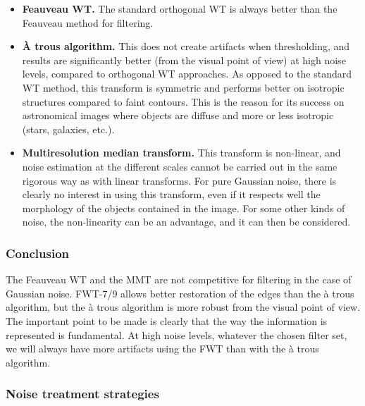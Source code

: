 \begin{itemize}
\item {\bf Feauveau WT.}
 The standard orthogonal WT is always better than
the Feauveau method for filtering.

\item {\bf \`A trous algorithm.} 
This does not create artifacts when thresholding,
and results are significantly better (from the visual point of view) at 
high noise levels, compared to 
orthogonal WT approaches. As opposed to the standard WT method,
this transform is symmetric and performs better on 
isotropic structures compared to faint contours. This is the reason
for its success on astronomical images where objects are diffuse and 
more or less isotropic (stars, galaxies, etc.). 

\item{\bf Multiresolution median transform.} 
This transform is non-linear, and noise estimation at the 
different scales cannot be carried out in
the same rigorous way as with linear transforms. For pure Gaussian noise,
there is clearly no interest in using this transform, even if it respects well
the morphology of the objects contained in the image. For some other kinds
of noise,
the non-linearity can be an advantage, and it can then be considered.
\end{itemize}
 
\subsubsection*{Conclusion}
The Feauveau WT and the MMT are not competitive for filtering in the 
case of Gaussian noise. FWT-7/9 allows better restoration of the edges than
the \`a trous algorithm, but the \`a trous algorithm is more robust from
the visual point of view.
The important point to be made is clearly that the way the information
is represented is fundamental. At high noise levels, whatever the chosen filter set,
we will always have more artifacts using the FWT than with 
the \`a trous algorithm.

\subsubsection{Noise treatment strategies} 

